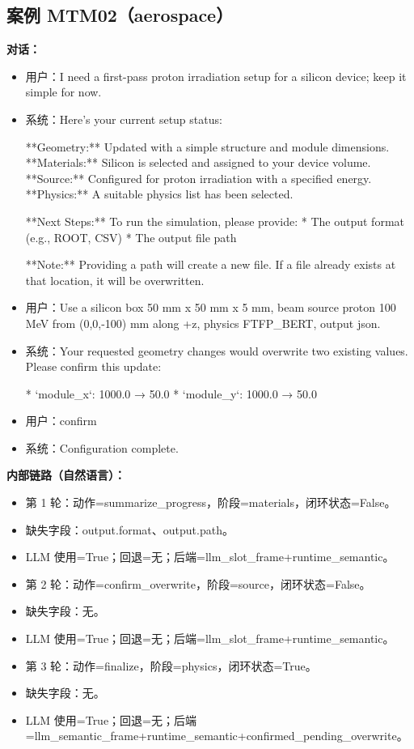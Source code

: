 \documentclass[11pt]{ctexart}
\begin{document}
\subsection{案例 MTM02（aerospace）}
\textbf{对话：}
\begin{itemize}
\item 用户：I need a first-pass proton irradiation setup for a silicon device; keep it simple for now.
\item 系统：Here's your current setup status:

**Geometry:** Updated with a simple structure and module dimensions.
**Materials:** Silicon is selected and assigned to your device volume.
**Source:** Configured for proton irradiation with a specified energy.
**Physics:** A suitable physics list has been selected.

**Next Steps:** To run the simulation, please provide:
*   The output format (e.g., ROOT, CSV)
*   The output file path

**Note:** Providing a path will create a new file. If a file already exists at that location, it will be overwritten.
\item 用户：Use a silicon box 50 mm x 50 mm x 5 mm, beam source proton 100 MeV from (0,0,-100) mm along +z, physics FTFP\_BERT, output json.
\item 系统：Your requested geometry changes would overwrite two existing values. Please confirm this update:

*   `module\_x`: 1000.0 → 50.0
*   `module\_y`: 1000.0 → 50.0
\item 用户：confirm
\item 系统：Configuration complete.
\end{itemize}
\textbf{内部链路（自然语言）：}
\begin{itemize}
\item 第 1 轮：动作=summarize\_progress，阶段=materials，闭环状态=False。
\item 缺失字段：output.format、output.path。
\item LLM 使用=True；回退=无；后端=llm\_slot\_frame+runtime\_semantic。
\item 第 2 轮：动作=confirm\_overwrite，阶段=source，闭环状态=False。
\item 缺失字段：无。
\item LLM 使用=True；回退=无；后端=llm\_slot\_frame+runtime\_semantic。
\item 第 3 轮：动作=finalize，阶段=physics，闭环状态=True。
\item 缺失字段：无。
\item LLM 使用=True；回退=无；后端=llm\_semantic\_frame+runtime\_semantic+confirmed\_pending\_overwrite。
\end{itemize}
\end{document}

